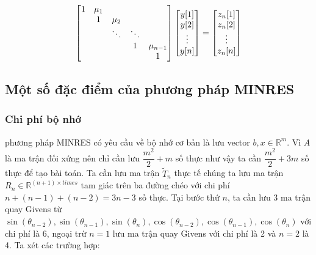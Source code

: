 \documentclass[14pt, a4paper]{article}
\numberwithin{equation}{section}
\numberwithin{algorithm}{section}
\numberwithin{figure}{section}
\numberwithin{dl}{section}
\numberwithin{md}{section}
\numberwithin{bd}{section}
\numberwithin{dn}{section}
\numberwithin{hq}{section}
\begin{document}
\begin{equation} \label{eq:L-Backward-Substitution}
    \begin{bmatrix} 1 & \mu_1 & \thickspace & \thickspace & \thickspace \\
        \thickspace & 1 & \mu_2 & \thickspace & \thickspace \\
        \thickspace & \thickspace & \ddots & \ddots & \thickspace \\
        \thickspace & \thickspace & \thickspace & 1 & \mu_{n-1} \\
        \thickspace & \thickspace & \thickspace & \thickspace & 1 \end{bmatrix} \begin{bmatrix} y \lbrack 1 \rbrack \\ y \lbrack 2 \rbrack \\ \vdots \\ y \lbrack n \rbrack \end{bmatrix} = \begin{bmatrix} z_n \lbrack 1 \rbrack \\ z_n \lbrack 2 \rbrack \\ \vdots \\ z_n \lbrack n \rbrack \end{bmatrix}
\end{equation}
\subsection{Một số đặc điểm của phương pháp MINRES}

\subsubsection{Chi phí bộ nhớ} \label{MINRES-Storage}

phương pháp MINRES có yêu cầu về bộ nhớ cơ bản là lưu vector $b, x \in \mathbb{R}^m$. Vì $A$ là ma trận đối xứng nên chỉ cần lưu $\dfrac{m^2}{2} + m$ số thực như vậy ta cần $\dfrac{m^2}{2} + 3m$ số thực để tạo bài toán.
Ta cần lưu ma trận $\widetilde{T}_n$ thực tế chúng ta lưu ma trận $R_n \in \mathbb{R}^{(n+1) \times times}$ tam giác trên ba đường chéo với chi phí $n+(n-1) + (n-2)=3n-3$ số thực. Tại bước thứ $n$, ta cần lưu 3 ma trận quay Givens từ $\sin(\theta_{n-2}), \sin(\theta_{n-1}), \sin(\theta_n), \cos(\theta_{n-2}), \cos(\theta_{n-1}), \cos(\theta_n)$ với chi phí là 6, ngoại trừ $n=1$ lưu ma trận quay Givens với chi phí là 2 và $n=2$ là 4.
Ta xét các trường hợp:
\end{document}
